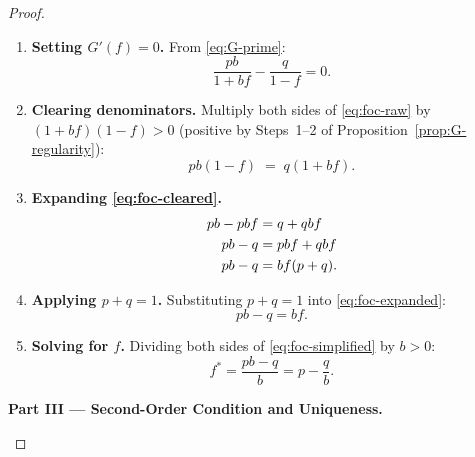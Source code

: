 \documentclass[12pt,openany]{book}
\numberwithin{equation}{chapter}
\theoremstyle{plain}
\theoremstyle{definition}
\theoremstyle{remark}
\numberwithin{equation}{chapter}
\theoremstyle{plain}
\begin{document}
\begin{proof}
\begin{enumerate}[label=\textbf{Step \arabic*.}, leftmargin=*, widest=Step 9,
                  resume]

  \item \textbf{Setting $G'(f) = 0$.}
        From \eqref{eq:G-prime}:
        \begin{equation}
          \frac{pb}{1 + bf} - \frac{q}{1 - f} = 0.
          \label{eq:foc-raw}
        \end{equation}

  \item \textbf{Clearing denominators.}
        Multiply both sides of \eqref{eq:foc-raw} by
        $(1 + bf)(1 - f) > 0$ (positive by Steps~1--2 of
        Proposition~\ref{prop:G-regularity}):
        \begin{equation}
          pb(1 - f) \;=\; q(1 + bf).
          \label{eq:foc-cleared}
        \end{equation}

  \item \textbf{Expanding \eqref{eq:foc-cleared}.}
        \begin{align}
          pb - pbf &= q + qbf \notag \\
          pb - q   &= pbf + qbf \notag \\
          pb - q   &= bf(p + q). \label{eq:foc-expanded}
        \end{align}

  \item \textbf{Applying $p + q = 1$.}
        Substituting $p + q = 1$ into \eqref{eq:foc-expanded}:
        \begin{equation}
          pb - q = bf.
          \label{eq:foc-simplified}
        \end{equation}

  \item \textbf{Solving for $f$.}
        Dividing both sides of \eqref{eq:foc-simplified} by $b > 0$:
        \begin{equation}
          f^{*} = \frac{pb - q}{b} = p - \frac{q}{b}.
          \label{eq:kelly-derived}
        \end{equation}

\end{enumerate}

\medskip
\noindent\textbf{Part III --- Second-Order Condition and Uniqueness.}

\begin{enumerate}[label=\textbf{Step \arabic*.}, leftmargin=*, widest=Step 9,
                  resume]


\end{enumerate}
\end{proof}
\end{document}
